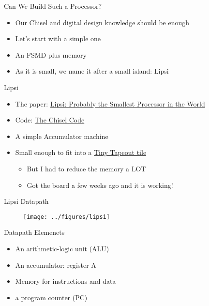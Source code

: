 \begin{frame}[fragile]{Can We Build Such a Processor?}
\begin{itemize}
\item Our Chisel and digital design knowledge should be enough
\item Let's start with a simple one
\item An FSMD plus memory
\item As it is small, we  name it after a small island: Lipsi
\end{itemize}
\end{frame}

\begin{frame}[fragile]{Lipsi}
\begin{itemize}
\item The paper: \href{https://www.jopdesign.com/doc/lipsi.pdf}{Lipsi: Probably the Smallest Processor in the World}
\item Code: \href{https://github.com/schoeberl/lipsi}{The Chisel Code}
\item A simple Accumulator machine
\item Small enough to fit into a \href{https://github.com/schoeberl/tt06-lipsi}{Tiny Tapeout tile}
\begin{itemize}
\item But I had to reduce the memory a LOT
\item Got the board a few weeks ago and it is working!
\end{itemize}
\end{itemize}
\end{frame}


\begin{frame}[fragile]{Lipsi Datapath}
\begin{figure}
  \texttt{[image: ../figures/lipsi]}
\end{figure}
\end{frame}

\begin{frame}[fragile]{Datapath Elemenets}
\begin{itemize}
\item An arithmetic-logic unit (ALU)
\item An accumulator: register A
\item Memory for instructions and data
\item a program counter (PC)
\end{itemize}
\end{frame}

